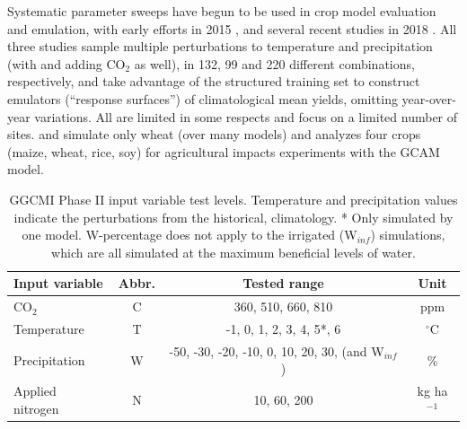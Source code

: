 \documentclass[preprint, 5p, times, twocolumn]{elsarticle}
\begin{document}
Systematic parameter sweeps have begun to be used in crop model evaluation and emulation, with early efforts in 2015 \citep{Markowski2015, Pirttioja2015}, and several recent studies in 2018 \citep{FRONZEK20182, Snyder2018, RUIZRAMOS2018}. All three studies sample multiple perturbations to temperature and precipitation (with \citet{Snyder2018} and \citet{RUIZRAMOS2018} adding CO$_2$ as well), in 132, 99 and 220 different combinations, respectively, and take advantage of the structured training set to construct emulators (``response surfaces'') of climatological mean yields, omitting year-over-year variations. All are limited in some respects and focus on a limited number of sites. \citet{FRONZEK20182} and \citet{RUIZRAMOS2018} simulate only wheat (over many models) and \citet{Snyder2018} analyzes four crops (maize, wheat, rice, soy) for agricultural impacts experiments with the GCAM \citep{calvin2019} model.


\begin{table}[!hb]
    \small \centering
    \begin{tabular}[0.75\linewidth]{lccc} 
        \hline \vspace{1mm}
        \textbf{Input variable} & \textbf{Abbr.} & \textbf{Tested range} & \textbf{Unit}\\ \hline \hline \vspace{1mm}
        {CO$_2$}& {C} & {360, 510, 660, 810} & {ppm}\\ \hline \vspace{1mm}
        {Temperature}& {T} & {-1, 0, 1, 2, 3, 4, 5*, 6} & {$^{\circ}$C}\\ \hline \vspace{1mm}
        {Precipitation}& {W} & {-50, -30, -20, -10, 0, 10, 20, 30, (and W$_{inf}$)} & {\%}\\ \hline \vspace{1mm}
        {Applied nitrogen}& {N} & {10, 60, 200} & {kg ha$^{-1}$}\\ \hline
    \end{tabular}\\
    \parbox{11cm}{\caption{GGCMI Phase II input variable test levels. Temperature and precipitation values indicate the perturbations from the historical, climatology. * Only simulated by one model. W-percentage does not apply to the irrigated (W$_{inf}$) simulations, which are all simulated at the maximum beneficial levels of water.}}
    \label{table:inputs}
\end{table}
\end{document}
